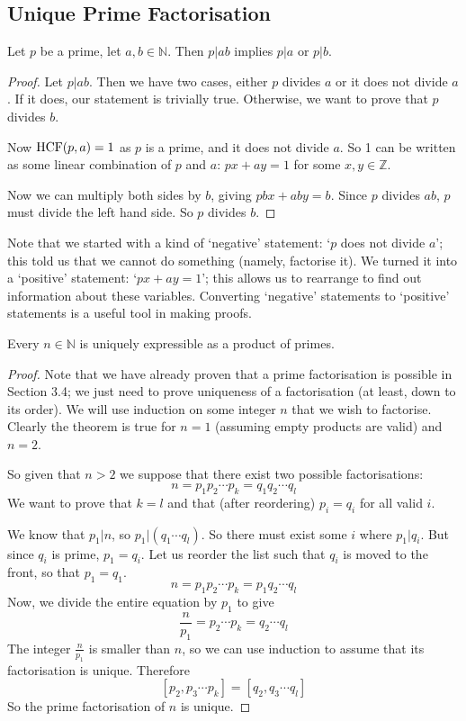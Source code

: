 \documentclass{article}
\begin{document}
	\subsection{Unique Prime Factorisation}
	\begin{lemma}
		Let $p$ be a prime, let $a, b \in \mathbb N$. Then $p | ab$ implies $p | a$ or $p | b$.
	\end{lemma}
	\begin{proof}
		Let $p | ab$. Then we have two cases, either $p$ divides $a$ or it does not divide $a$. If it does, our statement is trivially true. Otherwise, we want to prove that $p$ divides $b$.
		
		Now $\operatorname{HCF}(p, a)=1$ as $p$ is a prime, and it does not divide $a$. So 1 can be written as some linear combination of $p$ and $a$: $px + ay = 1$ for some $x, y \in \mathbb Z$.
		
		Now we can multiply both sides by $b$, giving $pbx + aby = b$. Since $p$ divides $ab$, $p$ must divide the left hand side. So $p$ divides $b$.
	\end{proof}
	Note that we started with a kind of `negative' statement: `$p$ does not divide $a$'; this told us that we cannot do something (namely, factorise it). We turned it into a `positive' statement: `$px + ay = 1$'; this allows us to rearrange to find out information about these variables. Converting `negative' statements to `positive' statements is a useful tool in making proofs.
	
	\begin{theorem}
		Every $n \in \mathbb N$ is uniquely expressible as a product of primes.
	\end{theorem}
	\begin{proof}
		Note that we have already proven that a prime factorisation is possible in Section 3.4; we just need to prove uniqueness of a factorisation (at least, down to its order). We will use induction on some integer $n$ that we wish to factorise. Clearly the theorem is true for $n=1$ (assuming empty products are valid) and $n=2$.
		
		So given that $n > 2$ we suppose that there exist two possible factorisations:
		\[ n = p_1 p_2 \cdots p_k = q_1 q_2 \cdots q_l \]
		We want to prove that $k=l$ and that (after reordering) $p_i = q_i$ for all valid $i$.
		
		We know that $p_1 | n$, so $p_1 | (q_1 \cdots q_l)$. So there must exist some $i$ where $p_1 | q_i$. But since $q_i$ is prime, $p_1 = q_i$. Let us reorder the list such that $q_i$ is moved to the front, so that $p_1 = q_1$.
		\[ n = p_1 p_2 \cdots p_k = p_1 q_2 \cdots q_l \]
		Now, we divide the entire equation by $p_1$ to give
		\[ \frac{n}{p_1} = p_2 \cdots p_k = q_2 \cdots q_l \]
		The integer $\frac{n}{p_1}$ is smaller than $n$, so we can use induction to assume that its factorisation is unique. Therefore
		\[ [p_2, p_3 \cdots p_k] = [q_2, q_3 \cdots q_l] \]
		So the prime factorisation of $n$ is unique.
	\end{proof}
\end{document}
